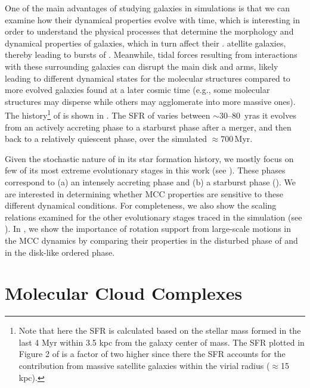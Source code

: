 \IfFileExists{emulateapjlegacy.cls}{\documentclass[iop]{emulateapjlegacy}}{\documentclass[iop]{emulateapj}}
\begin{document}
One of the main advantages of studying galaxies in simulations is that we can examine how their dynamical properties evolve with time, which
is interesting in order to understand the physical processes that determine the morphology and dynamical properties of galaxies, which in turn affect their \SF.
%
atellite galaxies, thereby leading to bursts of \SF. Meanwhile, tidal forces resulting from interactions with these surrounding galaxies can disrupt the main disk and arms, likely leading to different dynamical states for the molecular structures compared to more evolved galaxies found at a later cosmic time (e.g., some molecular structures may disperse while others may agglomerate into more massive ones). %
The \SF history\footnote{Note that here the SFR is calculated based on the stellar mass formed in the last 4 Myr within 3.5 kpc from the galaxy center of mass. The SFR plotted in Figure 2 of \citet{Pallottini17b} is a factor of two higher since there the SFR accounts for the contribution from massive satellite galaxies within the virial radius ($\approx$15\,kpc).} of \flower is shown in . The SFR of \flower varies between $\sim$30--80 \Msun\,yr\pmOne as it evolves from an actively accreting phase to a starburst phase after a merger, and then back to a relatively quiescent phase, over the simulated $\approx 700$\,Myr.

Given the stochastic nature of \flower in its star formation history, we mostly focus on few of its most extreme evolutionary stages in this work (see ).
%
These phases correspond to (a) an intensely accreting phase and (b) a starburst phase (). We are interested in determining whether MCC properties are sensitive to these different dynamical conditions. For completeness, we also show the scaling relations examined for the other evolutionary stages traced in the simulation (see ).
In , we show the importance of rotation support from large-scale motions in the MCC dynamics 
by comparing their properties in the disturbed phase of \flower and in the disk-like ordered phase.


\section{Molecular Cloud Complexes}\label{sec:eqn}
\end{document}
